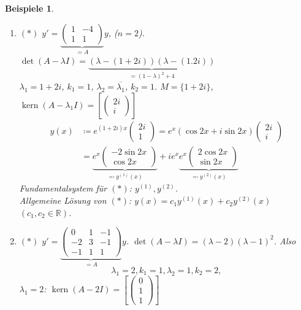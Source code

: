 \documentclass[12pt]{extreport} %
\newcommand{\R}{\mathbb{R}}
\theoremstyle{named}
\theoremstyle{nnamed}
\theoremstyle{itshape}
\theoremstyle{normal}
\newtheorem*{beispiele}{Beispiele}
\begin{document}
\begin{beispiele} ~\
	\begin{enumerate}
		\item $(*)$ $y' = \underbrace{\begin{pmatrix} 1 & -4 \\ 1 & 1 \end{pmatrix}}_{= A} y$, ($n = 2$). $\det \left( A - \lambda I \right) = \underbrace{\left( \lambda - (1+2i) \right) \left( \lambda - (1.2i) \right)}_{= (1-\lambda)^{2} + 4}$ ~\\
			$\lambda_{1} = 1 + 2i$, $k_{1} = 1$, $\lambda_{2} = \overline{\lambda_{1}}$, $k_{2} = 1$. $M = \{ 1 + 2i \}$, $\operatorname{kern}(A-\lambda_{1}I) = \left[ \begin{pmatrix}
				2i \\ i \end{pmatrix} \right]$
			\begin{align*}
				y(x) & \coloneqq e^{(1+2i)x} \begin{pmatrix} 2i \\ 1 \end{pmatrix} = e^{x} \left( \cos 2x + i \sin 2x \right) \begin{pmatrix} 2i \\ i \end{pmatrix} \\
				& = \underbrace{e^{x} \begin{pmatrix} -2 \sin 2x \\ \cos 2x \end{pmatrix}}_{\eqqcolon y^{(1)}(x)} + i e^{x} \underbrace{e^{x} \begin{pmatrix} 2 \cos 2x \\ \sin 2x \end{pmatrix}}_{\eqqcolon y^{(2)}(x)} 
			\end{align*}
			Fundamentalsystem für $(*)$: $y^{(1)}, y^{(2)}$. ~\\
			Allgemeine Lösung von $(*)$: $y(x) = c_{1} y^{(1)}(x) + c_{2} y^{(2)}(x)$ $(c_{1}, c_{2} \in \R)$.
		\item $(*)$ $y' = \underbrace{\begin{pmatrix} 0 & 1 & -1 \\ -2 & 3 & -1 \\ -1 & 1 & 1 \end{pmatrix}}_{= A} y$. $\det \left( A - \lambda I \right) = (\lambda - 2)  \left( \lambda - 1\right)^{2}$. Also
			 $$ \lambda_{1} = 2, k_{1} = 1, \lambda_{2} = 1, k_{2} = 2, $$
			$\lambda_{1} = 2$: $\operatorname{kern}(A - 2I) = \left[ \begin{pmatrix} 0 \\ 1 \\ 1  \end{pmatrix} \right]$

\end{enumerate}
\end{beispiele}
\end{document}
